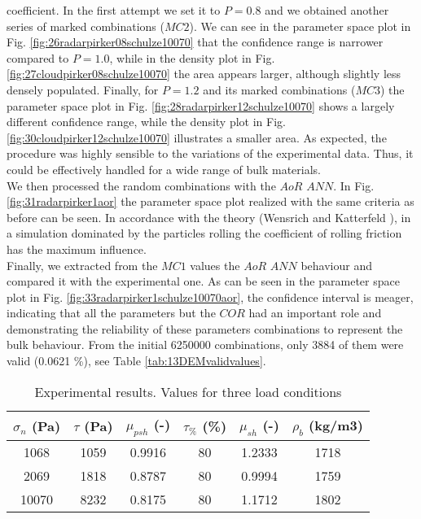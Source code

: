 \documentclass[review]{elsarticle}
\begin{document}
coefficient. In the first attempt we set it to $P=0.8$ and we obtained another
series of marked combinations ($MC2$).
We can see in the parameter space plot in Fig.
\ref{fig:26radarpirker08schulze10070} that the confidence range is narrower
compared to $P=1.0$, while in the density plot in Fig. 
\ref{fig:27cloudpirker08schulze10070} the area
appears larger, although slightly less densely populated. Finally, for $P=1.2$
and its marked combinations ($MC3$) the parameter space plot in Fig.
\ref{fig:28radarpirker12schulze10070} shows a largely different confidence
range, while the density plot in Fig. \ref{fig:30cloudpirker12schulze10070} 
illustrates a smaller area. As expected, the procedure was highly sensible to the variations of the experimental data. 
Thus, it could be effectively handled for a wide range of bulk materials.\\
We then processed the random combinations with the $AoR$ $ANN$. In Fig.
\ref{fig:31radarpirker1aor} the parameter space plot realized with the same criteria as
before can be seen.
In accordance with the theory (Wensrich and Katterfeld \cite{RefWorks:87}), in a simulation dominated
by the particles rolling the coefficient of rolling friction has the maximum
influence. \\
Finally, we extracted from the $MC1$ values the $AoR$ $ANN$ behaviour
and compared it with the experimental one.
As can be seen in the parameter space plot in Fig.
\ref{fig:33radarpirker1schulze10070aor}, the confidence interval is meager,
indicating that all the parameters but the $COR$ had an important role and demonstrating the reliability of these parameters
combinations to represent the bulk behaviour.
From the initial 6250000 combinations, only 3884 of them were valid (0.0621 \%),
see Table \ref{tab:13DEMvalidvalues}.
\begin{table}[h]
\centering
\begin{tabular}{cccccc}
\hline
$\sigma_n$ (Pa) & $\tau$ (Pa) & $\mu_{psh}$ (-) & $\tau_{\%}$ (\%) &
$\mu_{sh}$ (-) & $\rho_b$ (kg/m3) \\
\hline
    1068  & 1059  & 0.9916 & 80 & 1.2333 & 1718 \\
    2069  & 1818  & 0.8787 & 80 & 0.9994 & 1759 \\
    10070 & 8232  & 0.8175 & 80 & 1.1712 & 1802 \\

\hline
\end{tabular}
\caption[Experimental results]{Experimental results. Values for three
load conditions}
\label{tab:05sinterTableExperimental}
\end{table}
\end{document}
